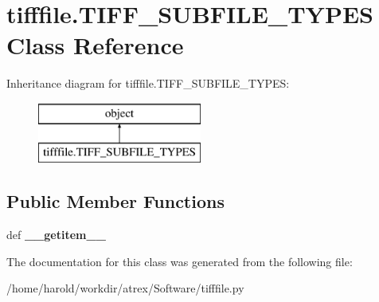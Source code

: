 \hypertarget{classtifffile_1_1TIFF__SUBFILE__TYPES}{\section{tifffile.\-T\-I\-F\-F\-\_\-\-S\-U\-B\-F\-I\-L\-E\-\_\-\-T\-Y\-P\-E\-S Class Reference}
\label{classtifffile_1_1TIFF__SUBFILE__TYPES}
}
Inheritance diagram for tifffile.\-T\-I\-F\-F\-\_\-\-S\-U\-B\-F\-I\-L\-E\-\_\-\-T\-Y\-P\-E\-S\-:\begin{figure}[H]
\begin{center}
\leavevmode
\includegraphics[height=2.000000cm]{classtifffile_1_1TIFF__SUBFILE__TYPES}
\end{center}
\end{figure}
\subsection*{Public Member Functions}
\begin{DoxyCompactItemize}
\item 
\hypertarget{classtifffile_1_1TIFF__SUBFILE__TYPES_a64c992e0cabb37664338e4a7edfa34c8}{def {\bfseries \-\_\-\-\_\-getitem\-\_\-\-\_\-}}\label{classtifffile_1_1TIFF__SUBFILE__TYPES_a64c992e0cabb37664338e4a7edfa34c8}

\end{DoxyCompactItemize}


The documentation for this class was generated from the following file\-:\begin{DoxyCompactItemize}
\item 
/home/harold/workdir/atrex/\-Software/tifffile.\-py\end{DoxyCompactItemize}
